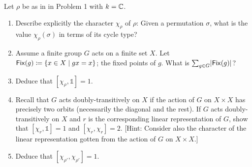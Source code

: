 \begin{problem}
Let $\rho$ be as in in Problem 1 with $k = \mathbb{C}$.
\begin{enumerate}[font=\normalfont,label=\textbf{(\alph*)}]

\item Describe explicitly the character $\chi_\rho$ of $\rho$: Given a permutation $\sigma$, what is the value $\chi_\rho(\sigma)$ in terms of its cycle type?

\item Assume a finite group $G$ acts on a finite set $X$. Let $\mathsf{Fix} (g) \coloneqq \{x\in X\mid gx = x\}$; the fixed points of $g$. What is $\sum_{g\in G}\lvert \mathsf{Fix}(g)\rvert$?

\item Deduce that $[\chi_\rho, \mathbb{1}] = 1$.
\item Recall that $G$ acts doubly-transitively on $X$ if the action of $G$ on $X \times X$ has precisely two orbits (necessarily the diagonal and the rest). If $G$ acts doubly-transitively on $X$ and $r$ is the corresponding linear representation of $G$, show that $[\chi_r, \mathbb{1}] = 1 $ and $[\chi_r, \chi_r] = 2$. [Hint: Consider also the character of the linear representation gotten from the action of $G$ on $X\times X$.]

\item Deduce that $[\chi_{\rho'}, \chi_{\rho'}] =1$.
\end{enumerate}
\end{problem}


